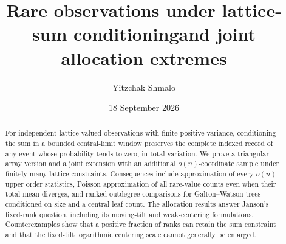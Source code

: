 \documentclass[11pt,reqno]{amsart}
\title[Rare observations and allocation extremes]{Rare observations under lattice-sum conditioning\newline and joint allocation extremes}
\author{Yitzchak Shmalo}
\date{18 September 2026}
\theoremstyle{remark}
\numberwithin{equation}{section}
\begin{document}
\begin{abstract}
For independent lattice-valued observations with finite positive variance, conditioning the sum in a bounded central-limit window preserves the complete indexed record of any event whose probability tends to zero, in total variation. We prove a triangular-array version and a joint extension with an additional $o(n)$-coordinate sample under finitely many lattice constraints. Consequences include approximation of every $o(n)$ upper order statistics, Poisson approximation of all rare-value counts even when their total mean diverges, and ranked outdegree comparisons for Galton--Watson trees conditioned on size and a central leaf count. The allocation results answer Janson's fixed-rank question, including its moving-tilt and weak-centering formulations. Counterexamples show that a positive fraction of ranks can retain the sum constraint and that the fixed-tilt logarithmic centering scale cannot generally be enlarged.
\end{abstract}
\maketitle







\end{document}
